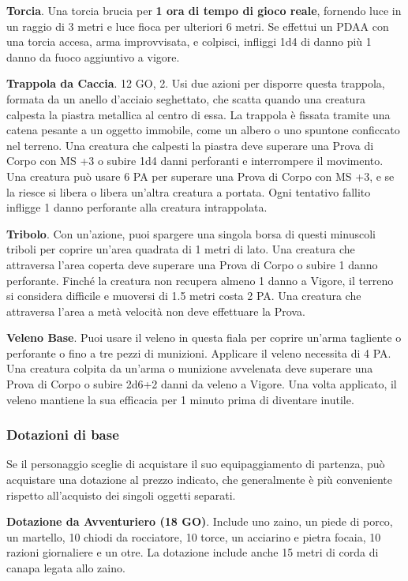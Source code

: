 \documentclass[12pt,a4paper,twoside,openany]{book}
\begin{document}
\begin{multicols}{2}
\textbf{Torcia}. Una torcia brucia per \textbf{1 ora di tempo di gioco reale}, fornendo luce in un raggio di 3 metri e luce fioca per ulteriori 6 metri. Se effettui un PDAA con una torcia accesa, arma improvvisata, e colpisci, infliggi 1d4 di danno più 1 danno da fuoco aggiuntivo a vigore. 

\textbf{Trappola da Caccia}. 12 GO, 2. Usi due azioni per disporre questa trappola, formata da un anello d’acciaio seghettato, che scatta quando una creatura calpesta la piastra metallica al centro di essa. La trappola è fissata tramite una catena pesante a un oggetto immobile, come un albero o uno spuntone conficcato nel terreno. Una creatura che calpesti la piastra deve superare una Prova di Corpo con MS +3 o subire 1d4 danni perforanti e interrompere il movimento. Una creatura può usare 6 PA per superare una Prova di Corpo con MS +3, e se la riesce si libera o libera un’altra creatura a portata. Ogni tentativo fallito infligge 1 danno perforante alla creatura intrappolata.

\textbf{Tribolo}. Con un’azione, puoi spargere una singola borsa di questi minuscoli triboli per coprire un’area quadrata di 1 metri di lato. Una creatura che attraversa l’area coperta deve superare una Prova di Corpo o subire 1 danno perforante. Finché la creatura non recupera almeno 1 danno a Vigore, il terreno si considera difficile e muoversi di 1.5 metri costa 2 PA. Una creatura che attraversa l’area a metà velocità non deve effettuare la Prova.

\textbf{Veleno Base}. Puoi usare il veleno in questa fiala per coprire un’arma tagliente o perforante o fino a tre pezzi di munizioni. Applicare il veleno necessita di 4 PA. Una creatura colpita da un’arma o munizione avvelenata deve superare una Prova di Corpo o subire 2d6+2 danni da veleno a Vigore.
Una volta applicato, il veleno mantiene la sua efficacia per 1 minuto prima di diventare inutile.

\subsubsection{Dotazioni di base}
Se il personaggio sceglie di acquistare il suo equipaggiamento di partenza, può acquistare una dotazione al prezzo indicato, che generalmente è più conveniente rispetto all'acquisto dei singoli oggetti separati.

\textbf{Dotazione da Avventuriero (18 GO)}. Include uno zaino, un piede di porco, un martello, 10 chiodi da rocciatore, 10 torce, un acciarino e pietra focaia, 10 razioni giornaliere e un otre. La dotazione include anche 15 metri di corda di canapa legata allo zaino.


\end{multicols}
\end{document}
